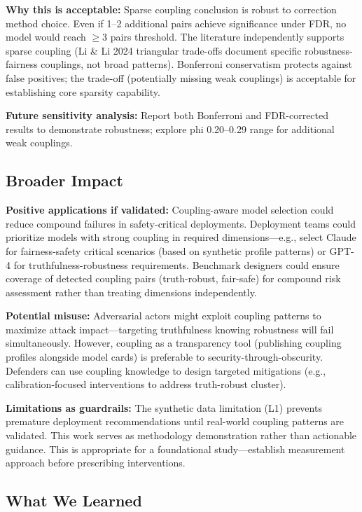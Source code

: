 \textbf{Why this is acceptable:} Sparse coupling conclusion is robust to correction method choice. Even if 1--2 additional pairs achieve significance under FDR, no model would reach $\geq$3 pairs threshold. The literature independently supports sparse coupling (Li \& Li 2024 triangular trade-offs document specific robustness-fairness couplings, not broad patterns). Bonferroni conservatism protects against false positives; the trade-off (potentially missing weak couplings) is acceptable for establishing core sparsity capability.

\textbf{Future sensitivity analysis:} Report both Bonferroni and FDR-corrected results to demonstrate robustness; explore phi 0.20--0.29 range for additional weak couplings.

\subsection{Broader Impact}

\textbf{Positive applications if validated:} Coupling-aware model selection could reduce compound failures in safety-critical deployments. Deployment teams could prioritize models with strong coupling in required dimensions---e.g., select Claude for fairness-safety critical scenarios (based on synthetic profile patterns) or GPT-4 for truthfulness-robustness requirements. Benchmark designers could ensure coverage of detected coupling pairs (truth-robust, fair-safe) for compound risk assessment rather than treating dimensions independently.

\textbf{Potential misuse:} Adversarial actors might exploit coupling patterns to maximize attack impact---targeting truthfulness knowing robustness will fail simultaneously. However, coupling as a transparency tool (publishing coupling profiles alongside model cards) is preferable to security-through-obscurity. Defenders can use coupling knowledge to design targeted mitigations (e.g., calibration-focused interventions to address truth-robust cluster).

\textbf{Limitations as guardrails:} The synthetic data limitation (L1) prevents premature deployment recommendations until real-world coupling patterns are validated. This work serves as methodology demonstration rather than actionable guidance. This is appropriate for a foundational study---establish measurement approach before prescribing interventions.

\subsection{What We Learned}

